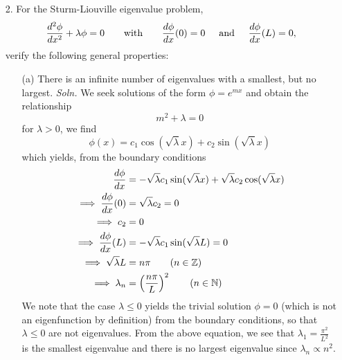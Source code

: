 \documentclass{article}
\begin{document}
\begin{itemize}
    \item[2.] For the Sturm-Liouville eigenvalue problem,
    \[\frac{d^2\phi}{dx^2} + \lambda \phi = 0 \hspace{0.7cm} \text{with} \hspace{0.7cm} \frac{d\phi}{dx}(0) = 0 \hspace{0.5cm} \text{and} \hspace{0.5cm} \frac{d\phi}{dx}(L) = 0,\]
    verify the following general properties:
    \begin{itemize}
        \item[(a)] There is an infinite number of eigenvalues with a smallest, but no largest.
        \newline\newline
        \textit{Soln.} We seek solutions of the form $\phi = e^{mx}$ and obtain the relationship
        \[m^2 + \lambda = 0\]
        for $\lambda > 0$, we find
        \[\phi(x) = c_1\cos(\sqrt{\lambda}x) + c_2\sin(\sqrt{\lambda}x)\]
        which yields, from the boundary conditions
        \begin{align*}
            \frac{d\phi}{dx} &= -\sqrt{\lambda}c_1\sin(\sqrt{\lambda}x) + \sqrt{\lambda}c_2\cos(\sqrt{\lambda}x)\\
            \implies \frac{d\phi}{dx}(0) &= \sqrt{\lambda}c_2 = 0\\
            \implies c_2 &= 0\\
            \implies \frac{d\phi}{dx}(L) &= -\sqrt{\lambda}c_1\sin(\sqrt{\lambda}L) = 0\\
            \implies \sqrt{\lambda}L &= n\pi \tag{$n \in \mathbb{Z}$}\\
            \implies \lambda_n &= \left(\frac{n\pi}{L}\right)^2 \tag{$n \in \mathbb{N}$}
        \end{align*}
        We note that the case $\lambda \leq 0$ yields the trivial solution $\phi = 0$ (which is not an eigenfunction by definition) from the boundary conditions, so that $\lambda \leq 0$ are not eigenvalues. From the above equation, we see that $\lambda_1 = \frac{\pi^2}{L^2}$ is the smallest eigenvalue and there is no largest eigenvalue since $\lambda_n \propto n^2$.
        \newline\newline


\end{itemize}
\end{itemize}
\end{document}
